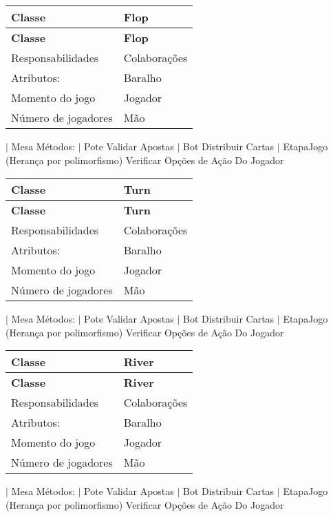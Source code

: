 \tabulinesep=1mm
\begin{longtabu} spread 0pt [c]{*{2}{|X[-1]}|}
\hline
\rowcolor{\tableheadbgcolor}\textbf{ Classe }&\textbf{ Flop  }\\
\endfirsthead
\hline
\endfoot
\hline
\rowcolor{\tableheadbgcolor}\textbf{ Classe }&\textbf{ Flop  }\\
\endhead
Responsabilidades &Colaborações \\
Atributos\+:&Baralho \\
Momento do jogo &Jogador \\
Número de jogadores &Mão \\
\end{longtabu}
$\vert$ Mesa Métodos\+: $\vert$ Pote Validar Apostas $\vert$ Bot Distribuir Cartas $\vert$ Etapa\+Jogo (Herança por polimorfismo) Verificar Opções de Ação Do Jogador

\tabulinesep=1mm
\begin{longtabu} spread 0pt [c]{*{2}{|X[-1]}|}
\hline
\rowcolor{\tableheadbgcolor}\textbf{ Classe }&\textbf{ Turn  }\\
\endfirsthead
\hline
\endfoot
\hline
\rowcolor{\tableheadbgcolor}\textbf{ Classe }&\textbf{ Turn  }\\
\endhead
Responsabilidades &Colaborações \\
Atributos\+:&Baralho \\
Momento do jogo &Jogador \\
Número de jogadores &Mão \\
\end{longtabu}
$\vert$ Mesa Métodos\+: $\vert$ Pote Validar Apostas $\vert$ Bot Distribuir Cartas $\vert$ Etapa\+Jogo (Herança por polimorfismo) Verificar Opções de Ação Do Jogador

\tabulinesep=1mm
\begin{longtabu} spread 0pt [c]{*{2}{|X[-1]}|}
\hline
\rowcolor{\tableheadbgcolor}\textbf{ Classe }&\textbf{ River  }\\
\endfirsthead
\hline
\endfoot
\hline
\rowcolor{\tableheadbgcolor}\textbf{ Classe }&\textbf{ River  }\\
\endhead
Responsabilidades &Colaborações \\
Atributos\+:&Baralho \\
Momento do jogo &Jogador \\
Número de jogadores &Mão \\
\end{longtabu}
$\vert$ Mesa Métodos\+: $\vert$ Pote Validar Apostas $\vert$ Bot Distribuir Cartas $\vert$ Etapa\+Jogo (Herança por polimorfismo) Verificar Opções de Ação Do Jogador

